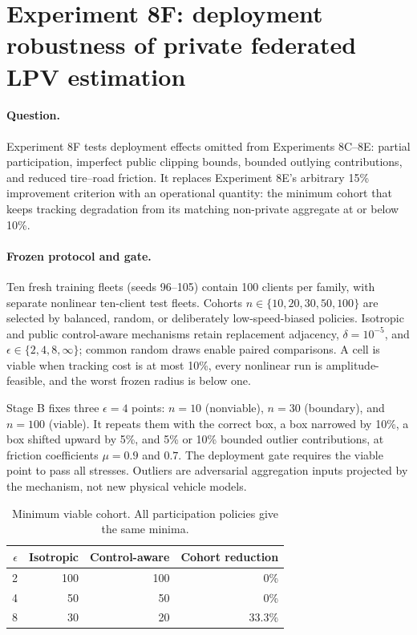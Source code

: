 \section{Experiment 8F: deployment robustness of private federated LPV estimation}
\label{sec:experiment8f}

\paragraph{Question.}
Experiment 8F tests deployment effects omitted from Experiments 8C--8E:
partial participation, imperfect public clipping bounds, bounded outlying
contributions, and reduced tire--road friction. It replaces Experiment 8E's
arbitrary 15\% improvement criterion with an operational quantity: the minimum
cohort that keeps tracking degradation from its matching non-private aggregate
at or below 10\%.

\paragraph{Frozen protocol and gate.}
Ten fresh training fleets (seeds 96--105) contain 100 clients per family, with
separate nonlinear ten-client test fleets. Cohorts
$n\in\{10,20,30,50,100\}$ are selected by balanced, random, or deliberately
low-speed-biased policies. Isotropic and public control-aware mechanisms retain
replacement adjacency, $\delta=10^{-5}$, and
$\epsilon\in\{2,4,8,\infty\}$; common random draws enable paired comparisons.
A cell is viable when tracking cost is at most 10\%, every nonlinear run is
amplitude-feasible, and the worst frozen radius is below one.

Stage B fixes three $\epsilon=4$ points: $n=10$ (nonviable), $n=30$
(boundary), and $n=100$ (viable). It repeats them with the correct box, a box
narrowed by 10\%, a box shifted upward by 5\%, and 5\% or 10\% bounded outlier
contributions, at friction coefficients $\mu=0.9$ and $0.7$. The deployment
gate requires the viable point to pass all stresses. Outliers are adversarial
aggregation inputs projected by the mechanism, not new physical vehicle models.

\begin{table}[htbp]
\centering
\caption{Minimum viable cohort. All participation policies give the same minima.}
\label{tab:experiment8f-cohort}
\begin{tabular}{rrrr}
\toprule
$\epsilon$ & Isotropic & Control-aware & Cohort reduction\\
\midrule
2 & 100 & 100 & 0\%\\
4 & 50 & 50 & 0\%\\
8 & 30 & 20 & 33.3\%\\
\bottomrule
\end{tabular}
\end{table}

